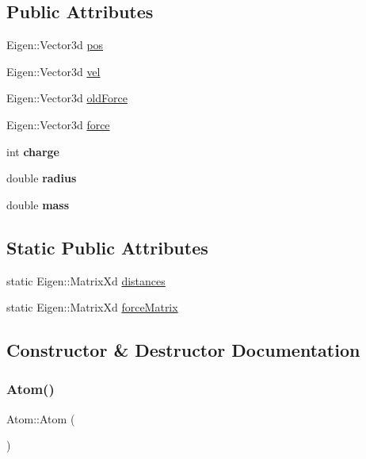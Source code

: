\subsection*{Public Attributes}
\begin{DoxyCompactItemize}
\item 
Eigen\+::\+Vector3d \mbox{\hyperlink{class_atom_a9c44a53717ca3857065c0a36787359e1}{pos}}
\item 
Eigen\+::\+Vector3d \mbox{\hyperlink{class_atom_aabc1e87e4ed861ae02f781d3f43d8481}{vel}}
\item 
Eigen\+::\+Vector3d \mbox{\hyperlink{class_atom_af5b2daf8c6f32465b0ab1aecab57915b}{old\+Force}}
\item 
Eigen\+::\+Vector3d \mbox{\hyperlink{class_atom_a33b530b8900b57bfa933ae79c7e95d71}{force}}
\item 
\mbox{\label{class_atom_a482b093515f1ad043b35646669445bda}} 
int {\bfseries charge}
\item 
\mbox{\label{class_atom_a3f68fa5a0bd341c3c6b73826da8e9302}} 
double {\bfseries radius}
\item 
\mbox{\label{class_atom_a90e6f00ca3ae2fda9b87cb27aac5929d}} 
double {\bfseries mass}
\end{DoxyCompactItemize}
\subsection*{Static Public Attributes}
\begin{DoxyCompactItemize}
\item 
static Eigen\+::\+Matrix\+Xd \mbox{\hyperlink{class_atom_a7ac21eb5765267ccafe658634c7cc45f}{distances}}
\item 
static Eigen\+::\+Matrix\+Xd \mbox{\hyperlink{class_atom_a8fadf04e83f1558c13192f91eee5348a}{force\+Matrix}}
\end{DoxyCompactItemize}


\subsection{Constructor \& Destructor Documentation}
\mbox{\label{class_atom_aa0147d7e49ab90f559b66e38d3d12863}} 
\subsubsection{\texorpdfstring{Atom()}{Atom()}}
{\footnotesize\ttfamily Atom\+::\+Atom (\begin{DoxyParamCaption}{ }\end{DoxyParamCaption})}

